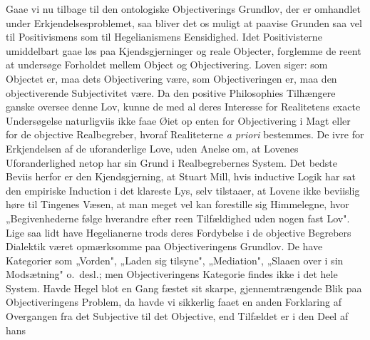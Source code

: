 \documentclass[12pt]{article}
\newcommand{\opage}[1]{\marginnote{\footnotesize\textit{[#1]}}}
\begin{document}
Gaae vi nu tilbage til den ontologiske Objectiverings Grundlov,
der er omhandlet under Erkjendelsesproblemet, saa bliver det os
muligt at paavise Grunden saa vel til Positivismens
\opage{34} som til Hegelianismens Eensidighed. Idet Positivisterne
umiddelbart gaae løs paa Kjendsgjerninger og reale Objecter,
forglemme de reent at undersøge Forholdet mellem Object og
Objectivering. Loven siger: som Objectet er, maa dets
Objectivering være, som Objectiveringen er, maa den objectiverende
Subjectivitet være. Da den positive Philosophies Tilhængere ganske
oversee denne Lov, kunne de med al deres Interesse for Realitetens
exacte Undersøgelse naturligviis ikke faae Øiet op enten for
Objectivering i Magt eller for de objective Realbegreber, hvoraf
Realiteterne \textit{a priori} bestemmes. De ivre for Erkjendelsen
af de uforanderlige Love, uden Anelse om, at Lovenes
Uforanderlighed netop har sin Grund i Realbegrebernes System. Det
bedste Beviis herfor er den Kjendsgjerning, at Stuart Mill, hvis
inductive Logik har sat den empiriske Induction i det klareste
Lys, selv tilstaaer, at Lovene ikke beviislig høre til Tingenes
Væsen, at man meget vel kan forestille sig Himmelegne, hvor
„Begivenhederne følge hverandre efter reen Tilfældighed uden nogen
fast Lov". Lige saa lidt have Hegelianerne trods deres Fordybelse
i de objective Begrebers Dialektik været opmærksomme paa
Objectiveringens Grundlov. De have Kategorier som „Vorden",
„Laden sig tilsyne", „Mediation", „Slaaen over i sin Modsætning"
o.\ desl.; men Objectiveringens Kategorie findes ikke i det hele
System. Havde Hegel blot en Gang fæstet sit skarpe,
gjennemtrængende Blik paa Objectiveringens Problem, da havde vi
sikkerlig faaet en anden Forklaring af Overgangen fra det
Subjective til det Objective, end Tilfældet er i den Deel af hans
\end{document}
